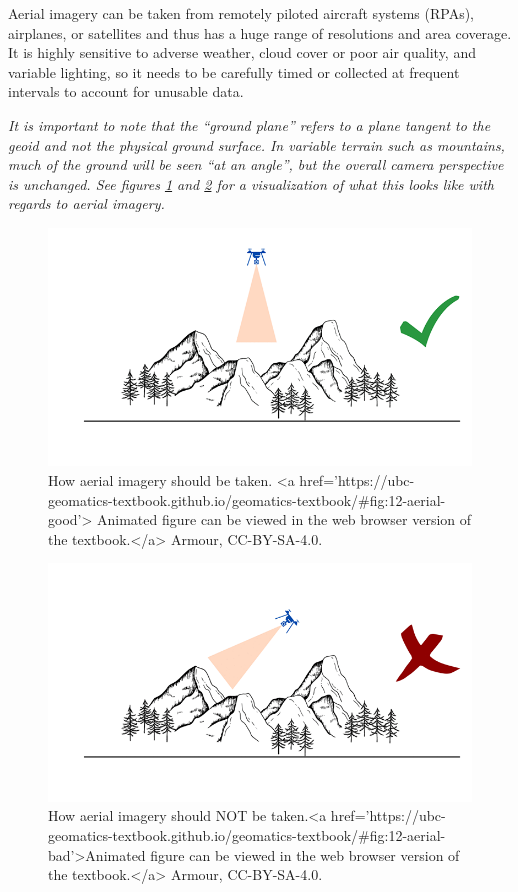 \documentclass[
]{book}
\begin{document}
Aerial imagery can be taken from remotely piloted aircraft systems (RPAs), airplanes, or satellites and thus has a huge range of resolutions and area coverage. It is highly sensitive to adverse weather, cloud cover or poor air quality, and variable lighting, so it needs to be carefully timed or collected at frequent intervals to account for unusable data.

\emph{It is important to note that the ``ground plane'' refers to a plane tangent to the geoid and not the physical ground surface. In variable terrain such as mountains, much of the ground will be seen ``at an angle'', but the overall camera perspective is unchanged. See figures \ref{fig:12-aerial-good} and \ref{fig:12-aerial-bad} for a visualization of what this looks like with regards to aerial imagery.}

\begin{figure}
\includegraphics[width=0.9\linewidth]{images/12-aerial-good} \caption{How aerial imagery should be taken. <a href='https://ubc-geomatics-textbook.github.io/geomatics-textbook/#fig:12-aerial-good'> Animated figure can be viewed in the web browser version of the textbook.</a> Armour, CC-BY-SA-4.0.}\label{fig:12-aerial-good}
\end{figure}

\begin{figure}
\includegraphics[width=0.9\linewidth]{images/12-aerial-bad} \caption{How aerial imagery should NOT be taken.<a href='https://ubc-geomatics-textbook.github.io/geomatics-textbook/#fig:12-aerial-bad'>Animated figure can be viewed in the web browser version of the textbook.</a> Armour, CC-BY-SA-4.0.}\label{fig:12-aerial-bad}
\end{figure}
\end{document}
